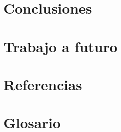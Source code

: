 \documentclass[oneside,10pt]{book}
\begin{document}
\chapter{Conclusiones}

\chapter{Trabajo a futuro}

\chapter{Referencias}

\chapter{Glosario}
\end{document}
